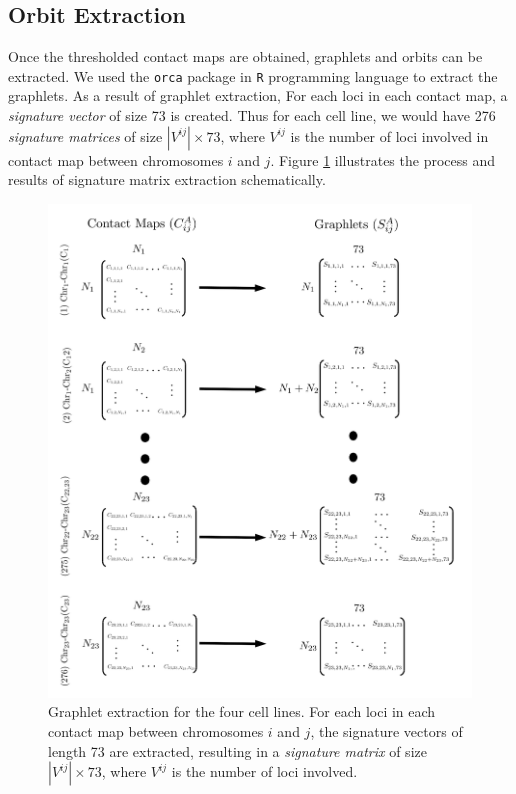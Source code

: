 \documentclass[]{article}
\begin{document}
\subsection{Orbit Extraction}
Once the thresholded contact maps are obtained, graphlets and orbits can be 
extracted. We used the \texttt{orca} package in \texttt{R} programming 
language to extract the graphlets. As a result of graphlet extraction, 
For each loci in each contact map, a \textit{signature vector} of size
73 is created. Thus for each cell line, we would have 276 
\textit{signature matrices} of
size $|V^{ij}|\times 73$, where $V^{ij}$ is the number of loci
involved in contact map between chromosomes $i$ and $j$. Figure
\ref{fig:graphlet_extraction} illustrates the process and results
of signature matrix extraction schematically.
\begin{figure}
    \centering
    \includegraphics[width=\textwidth]{figures/graphlet_extraction.png}
    \caption{Graphlet extraction for the four cell lines. For each
    loci in each contact map between chromosomes $i$ and $j$, 
    the signature vectors of length 73 are extracted, resulting 
    in a \textit{signature matrix} of size $|V^{ij}| \times 73$,
    where $V^{ij}$ 
    is the number of loci involved.}
    \label{fig:graphlet_extraction}
\end{figure}
\end{document}
